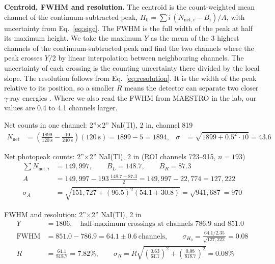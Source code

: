 \documentclass[12pt]{article}
\begin{document}
\textbf{Centroid, FWHM and resolution.} The centroid is the count-weighted mean channel of the continuum-subtracted peak, $H_0 = \sum i\,(N_{\text{net},i} - B_i)/A$, with uncertainty from Eq.~\ref{eq:sigc}. The FWHM is the full width of the peak at half its maximum height. We take the maximum $Y$ as the mean of the 3 highest channels of the continuum-subtracted peak and find the two channels where the peak crosses $Y/2$ by linear interpolation between neighbouring channels. The uncertainty of each crossing is the counting uncertainty there divided by the local slope. The resolution follows from Eq.~\ref{eq:resolution}. It is the width of the peak relative to its position, so a smaller $R$ means the detector can separate two closer $\gamma$-ray energies \cite{knoll}. Where we also read the FWHM from MAESTRO in the lab, our values are 0.4 to 4.1 channels larger.

\begin{samplecalc}{Net counts in one channel: 2''$\times$2'' NaI(Tl), 2 in, channel 819}
\begin{align*}
N_{\text{net}} &= \left(\frac{1899}{120\ \text{s}} - \frac{10}{240\ \text{s}}\right)(120\ \text{s}) = 1899 - 5 = 1894, &
\sigma &= \sqrt{1899 + 0.5^2 \cdot 10} = 43.6
\end{align*}
\end{samplecalc}

\begin{samplecalc}{Net photopeak counts: 2''$\times$2'' NaI(Tl), 2 in (ROI channels 723--915, $n = 193$)}
\begin{align*}
\textstyle\sum N_{\text{net},i} &= 149{,}997, \qquad B_L = 148.7, \qquad B_R = 87.3\\
A &= 149{,}997 - 193\,\frac{148.7 + 87.3}{2} = 149{,}997 - 22{,}774 = 127{,}222\\
\sigma_A &= \sqrt{151{,}727 + (96.5)^2(54.1 + 30.8)} = \sqrt{941{,}687} = 970
\end{align*}
\end{samplecalc}

\begin{samplecalc}{FWHM and resolution: 2''$\times$2'' NaI(Tl), 2 in}
\begin{align*}
Y &= 1806, \quad \text{half-maximum crossings at channels } 786.9 \text{ and } 851.0\\
\text{FWHM} &= 851.0 - 786.9 = 64.1 \pm 0.6\ \text{channels}, \qquad
\sigma_{H_0} = \frac{64.1/2.35}{\sqrt{127{,}222}} = 0.08\\
R &= \frac{64.1}{818.7} = 7.82\%, \qquad
\sigma_R = R\sqrt{\left(\frac{0.63}{64.1}\right)^2 + \left(\frac{0.08}{818.7}\right)^2} = 0.08\%
\end{align*}
\end{samplecalc}
\end{document}
